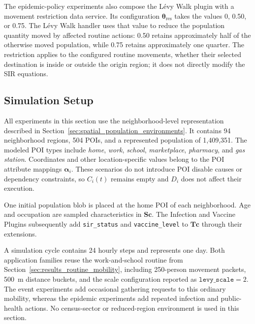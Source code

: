 The epidemic-policy experiments also compose the L\'evy Walk plugin with a movement restriction data service. Its configuration $\bm{\theta}_{\mathrm{res}}$ takes the values 0, 0.50, or 0.75. The L\'evy Walk handler uses that value to reduce the population quantity moved by affected routine actions: 0.50 retains approximately half of the otherwise moved population, while 0.75 retains approximately one quarter. The restriction applies to the configured routine movements, whether their selected destination is inside or outside the origin region; it does not directly modify the SIR equations.



\subsection{Simulation Setup}
\label{sec:large_scale_epidemic_setup}


All experiments in this section use the neighborhood-level representation described in Section~\ref{sec:spatial_population_environments}. It contains 94 neighborhood regions, 504 POIs, and a represented population of 1,409,351. The modeled POI types include \textit{home}, \textit{work}, \textit{school}, \textit{marketplace}, \textit{pharmacy}, and \textit{gas station}. Coordinates and other location-specific values belong to the POI attribute mappings $\bm{\alpha}_i$. These scenarios do not introduce POI disable causes or dependency constraints, so $C_i(t)$ remains empty and $D_i$ does not affect their execution.

One initial population blob is placed at the home POI of each neighborhood. Age and occupation are sampled characteristics in $\bm{Sc}$. The Infection and Vaccine Plugins subsequently add \texttt{sir\_status} and \texttt{vaccine\_level} to $\bm{Tc}$ through their extensions. %

A simulation cycle contains 24 hourly steps and represents one day. Both application families reuse the work-and-school routine from Section~\ref{sec:results_routine_mobility}, including 250-person movement packets, 500~m distance buckets, and the scale configuration reported as $\texttt{levy\_scale}=2$. The event experiments add occasional gathering requests to this ordinary mobility, whereas the epidemic experiments add repeated infection and public-health actions. No census-sector or reduced-region environment is used in this section.


